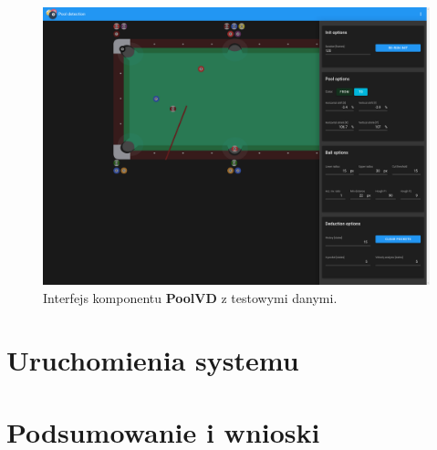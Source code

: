 \documentclass[12pt]{article}
\begin{document}
\begin{figure}[!ht]
    \centering
    \includegraphics[width=\linewidth]{./images/interface.png}
    \caption{Interfejs komponentu \textbf{PoolVD} z testowymi danymi.}
    \label{interface}
\end{figure}

\section{Uruchomienia systemu}
\section{Podsumowanie i wnioski}
\clearpage
\newpage

\printbibliography
\end{document}
